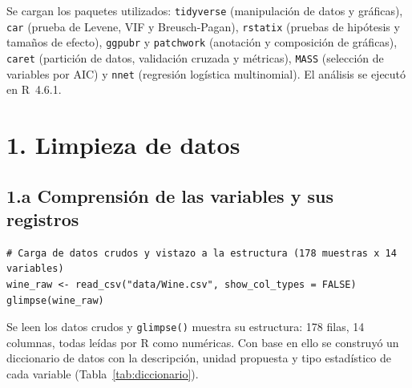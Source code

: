 \documentclass[10pt,letterpaper,twocolumn]{article}
\newcommand{\var}[1]{\texttt{#1}}
\begin{document}
Se cargan los paquetes utilizados: \var{tidyverse} (manipulación de datos y gráficas), \var{car} (prueba de Levene, VIF y Breusch-Pagan), \var{rstatix} (pruebas de hipótesis y tamaños de efecto), \var{ggpubr} y \var{patchwork} (anotación y composición de gráficas), \var{caret} (partición de datos, validación cruzada y métricas), \var{MASS} (selección de variables por AIC) y \var{nnet} (regresión logística multinomial). El análisis se ejecutó en R~4.6.1.

\section{1. Limpieza de datos}

\subsection{1.a Comprensión de las variables y sus registros}

\begin{lstlisting}[firstnumber=71]
# Carga de datos crudos y vistazo a la estructura (178 muestras x 14 variables)
wine_raw <- read_csv("data/Wine.csv", show_col_types = FALSE)
glimpse(wine_raw)
\end{lstlisting}

Se leen los datos crudos y \var{glimpse()} muestra su estructura: 178 filas, 14 columnas, todas leídas por R como numéricas. Con base en ello se construyó un diccionario de datos con la descripción, unidad propuesta y tipo estadístico de cada variable (Tabla~\ref{tab:diccionario}).
\end{document}

